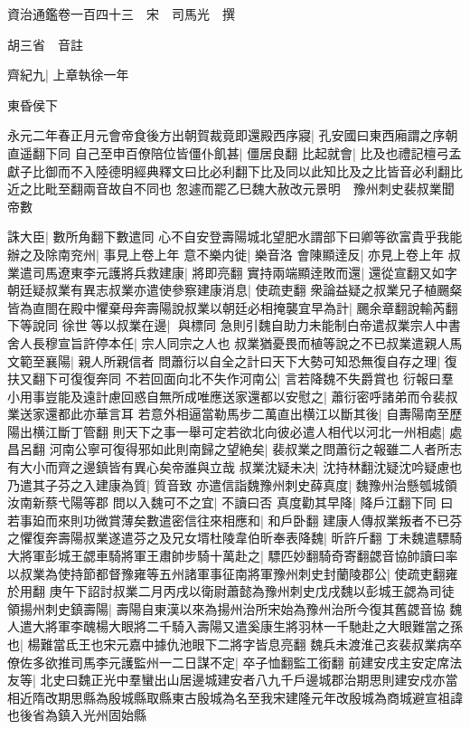 資治通鑑卷一百四十三　宋　司馬光　撰

胡三省　音註

齊紀九|{
	上章執徐一年}


東昏侯下

永元二年春正月元會帝食後方出朝賀裁竟即還殿西序寢|{
	孔安國曰東西廂謂之序朝直遥翻下同}
自己至申百僚陪位皆僵仆飢甚|{
	僵居良翻}
比起就會|{
	比及也禮記檀弓孟獻子比御而不入陸德明經典釋文曰比必利翻下比及同以此知比及之比皆音必利翻比近之比毗至翻兩音故自不同也}
怱遽而罷乙巳魏大赦改元景明　豫州刺史裴叔業聞帝數

誅大臣|{
	數所角翻下數遣同}
心不自安登壽陽城北望肥水謂部下曰卿等欲富貴乎我能辦之及除南兖州|{
	事見上卷上年}
意不樂内徙|{
	樂音洛}
會陳顯逹反|{
	亦見上卷上年}
叔業遣司馬遼東李元護將兵救建康|{
	將即亮翻}
實持兩端顯逹敗而還|{
	還從宣翻又如字}
朝廷疑叔業有異志叔業亦遣使參察建康消息|{
	使疏吏翻}
衆論益疑之叔業兄子植颺粲皆為直閤在殿中懼棄母奔壽陽說叔業以朝廷必相掩襲宜早為計|{
	颺余章翻說輸芮翻下等說同}
徐世等以叔業在邊|{
	與標同}
急則引魏自助力未能制白帝遣叔業宗人中書舍人長穆宣旨許停本任|{
	宗人同宗之人也}
叔業猶憂畏而植等說之不已叔業遣親人馬文範至襄陽|{
	親人所親信者}
問蕭衍以自全之計曰天下大勢可知恐無復自存之理|{
	復扶又翻下可復復奔同}
不若回面向北不失作河南公|{
	言若降魏不失爵賞也}
衍報曰羣小用事豈能及遠計慮回惑自無所成唯應送家還都以安慰之|{
	蕭衍密呼諸弟而令裴叔業送家還都此亦華言耳}
若意外相逼當勒馬步二萬直出横江以斷其後|{
	自夀陽南至歷陽出横江斷丁管翻}
則天下之事一舉可定若欲北向彼必遣人相代以河北一州相處|{
	處昌呂翻}
河南公寧可復得邪如此則南歸之望絶矣|{
	裴叔業之問蕭衍之報雖二人者所志有大小而齊之邊鎮皆有異心矣帝誰與立哉}
叔業沈疑未决|{
	沈持林翻沈疑沈吟疑慮也}
乃遣其子芬之入建康為質|{
	質音致}
亦遣信詣魏豫州刺史薛真度|{
	魏豫州治懸瓠城領汝南新蔡弋陽等郡}
問以入魏可不之宜|{
	不讀曰否}
真度勸其早降|{
	降戶江翻下同}
曰若事廹而來則功微賞薄矣數遣密信往來相應和|{
	和戶卧翻}
建康人傳叔業叛者不已芬之懼復奔壽陽叔業遂遣芬之及兄女壻杜陵韋伯昕奉表降魏|{
	昕許斤翻}
丁未魏遣驃騎大將軍彭城王勰車騎將軍王肅帥步騎十萬赴之|{
	驃匹妙翻騎奇寄翻勰音協帥讀曰率}
以叔業為使持節都督豫雍等五州諸軍事征南將軍豫州刺史封蘭陵郡公|{
	使疏吏翻雍於用翻}
庚午下詔討叔業二月丙戌以衛尉蕭懿為豫州刺史戊戌魏以彭城王勰為司徒領揚州刺史鎮壽陽|{
	壽陽自東漢以來為揚州治所宋始為豫州治所今復其舊勰音協}
魏人遣大將軍李醜楊大眼將二千騎入壽陽又遣奚康生將羽林一千馳赴之大眼難當之孫也|{
	楊難當氐王也宋元嘉中據仇池眼下二將字皆息亮翻}
魏兵未渡淮己亥裴叔業病卒僚佐多欲推司馬李元護監州一二日謀不定|{
	卒子恤翻監工銜翻}
前建安戌主安定席法友等|{
	北史曰魏正光中羣蠻出山居邊城建安者八九千戶邊城郡治期思則建安戍亦當相近隋改期思縣為殷城縣取縣東古殷城為名至我宋建隆元年改殷城為商城避宣祖諱也後省為鎮入光州固始縣}
